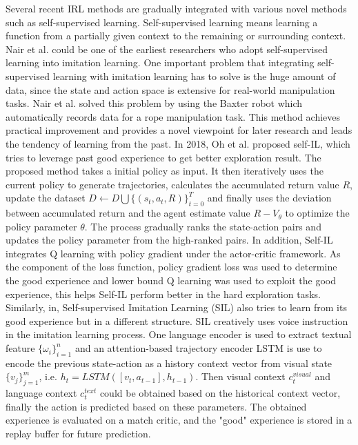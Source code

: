 \documentclass[acmsmall]{acmart}
\begin{document}
Several recent IRL methods are gradually integrated with various novel methods such as self-supervised learning. Self-supervised learning means learning a function from a partially given context to the remaining or surrounding context. Nair et al.\cite{nairCombiningSelfSupervisedLearning2017} could be one of the earliest researchers who adopt self-supervised learning into imitation learning. One important problem that integrating self-supervised learning with imitation learning has to solve is the huge amount of data, since the state and action space is extensive for real-world manipulation tasks. Nair et al. solved this problem by using the Baxter robot which automatically records data for a rope manipulation task. This method achieves practical improvement and provides a novel viewpoint for later research and leads the tendency of learning from the past. In 2018, Oh et al.\cite{ohSelfImitationLearning2018} proposed self-IL, which tries to leverage past good experience to get better exploration result. The proposed method takes a initial policy as input. It then iteratively uses the current policy to generate trajectories, calculates the accumulated return value $R$, update the dataset $D \leftarrow D \bigcup \{(s_t,a_t,R)\}_{t=0}^T$ and finally uses the deviation between accumulated return and the agent estimate value $R-V_\theta$ to optimize the policy parameter $\theta$. The process gradually ranks the state-action pairs and updates the policy parameter from the high-ranked pairs. In addition, Self-IL integrates Q learning with policy gradient under the actor-critic framework. As the component of the loss function, policy gradient loss was used to determine the good experience and lower bound Q learning was used to exploit the good experience, this helps Self-IL perform better in the hard exploration tasks. Similarly, in\cite{wang2019reinforced}, Self-supervised Imitation Learning (SIL) also tries to learn from its good experience but in a different structure. SIL creatively uses voice instruction in the imitation learning process. One language encoder is used to extract textual feature $\{\omega_i\}_{i=1}^n$ and an attention-based trajectory encoder LSTM is use to encode the previous state-action as a history context vector from visual state $\{v_j\}_{j=1}^m$, i.e. $h_t = LSTM([v_t,a_{t-1}],h_{t-1})$. Then visual context $c_t^{visual}$ and language context $c_t^{text}$ could be obtained based on the historical context vector, finally the action is predicted based on these parameters. The obtained experience is evaluated on a match critic, and the "good" experience is stored in a replay buffer for future prediction.
\end{document}
